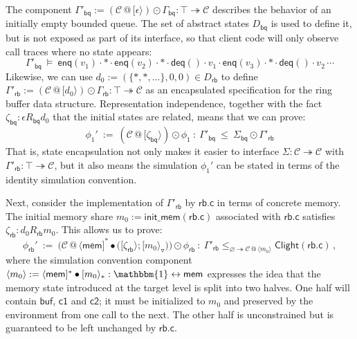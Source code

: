 \documentclass[acmsmall,screen,review,anonymous]{acmart}
\newcommand{\kw}[1]{\ensuremath{ \mathsf{#1} }}
\begin{document}


\begin{example} %
The component
$\Gamma'_\kw{bq} :=
 (\mathcal{C} \mathbin@ [\epsilon\rangle) \odot \Gamma_\kw{bq} :
 \top \twoheadrightarrow \mathcal{C}$
describes the behavior of an initially empty bounded queue.
The set of abstract states $D_\kw{bq}$ is used to define it,
but is not exposed as part of its interface,
so that client code will only observe call traces
where no state appears:
\[
  \Gamma'_\kw{bq} \: \vDash \:
    \kw{enq}(v_1) \cdot
    {*} \cdot
    \kw{enq}(v_2) \cdot
    {*} \cdot
    \kw{deq}() \cdot
    v_1 \cdot
    \kw{enq}(v_3) \cdot
    {*} \cdot
    \kw{deq}() \cdot
    v_2 \, \cdots
\]
Likewise,
we can use
$d_0 := (\{{*},{*},\ldots\}, 0, 0) \in D_\kw{rb}$
to define
$\Gamma'_\kw{rb} :=
 (\mathcal{C} \mathbin@ [d_0\rangle) \odot \Gamma_\kw{rb} :
 \top \twoheadrightarrow \mathcal{C}$
as an encapsulated specification for
the ring buffer data structure.
Representation independence, together with the fact
$\zeta_\kw{bq} : \epsilon \mathbin{R_\kw{bq}} d_0$
that the initial states are related,
means that we can prove:
\[
  \phi_1' \: := \:
  (\mathcal{C} \mathbin@ [\zeta_\kw{bq}\rangle) \odot \phi_1
  \: : \:
  \Gamma'_\kw{bq} \: \le \: \Sigma_\kw{bq} \odot \Gamma'_\kw{rb}
\]
That is,
state encapsulation not only makes it easier
to interface $\Sigma : \mathcal{C} \twoheadrightarrow \mathcal{C}$
with $\Gamma'_\kw{rb} : \top \twoheadrightarrow \mathcal{C}$,
but it also means the simulation
$\phi_1'$ can be stated in terms of the identity simulation convention.

Next, consider the implementation
of $\Gamma'_\kw{rb}$
by $\kw{rb.c}$
in terms of concrete memory.
The initial memory share $m_0 := \kw{init\_mem}(\kw{rb.c})$
associated with $\kw{rb.c}$ satisfies
$\zeta_\kw{rb} : d_0 \mathrel{R_\kw{rb}} m_0$.
This allows us to prove:
\[
  \phi_\kw{rb}' \: := \:
    \Big(
      \mathcal{C} \mathbin@
      \langle \kw{mem} ]^* \bullet
      \big(
        [\zeta_\kw{rb} \rangle \mathbin; [m_0\rangle_\triangledown
      \big)
    \Big) \odot \phi_\kw{rb}
  \: : \:
  \Gamma'_\kw{rb}
    \le_{\varnothing \twoheadrightarrow
      \mathcal{C} \mathbin@
        \langle m_0 \rangle}
    \kw{Clight}(\kw{rb.c})
  \,,
\]
where the simulation convention component
$\langle m_0 \rangle :=
 \langle \kw{mem} ]^* \bullet [m_0\rangle_* :
 \mathbbm{1} \leftrightarrow \kw{mem}$
expresses the idea that
the memory state introduced at the target level is split into two halves.
One half will contain $\kw{buf}$, $\kw{c1}$ and $\kw{c2}$;
it must be initialized to $m_0$
and preserved by the environment from one call to the next.
The other half is unconstrained
but is guaranteed to be left unchanged by $\kw{rb.c}$.


\end{example}
\end{document}
